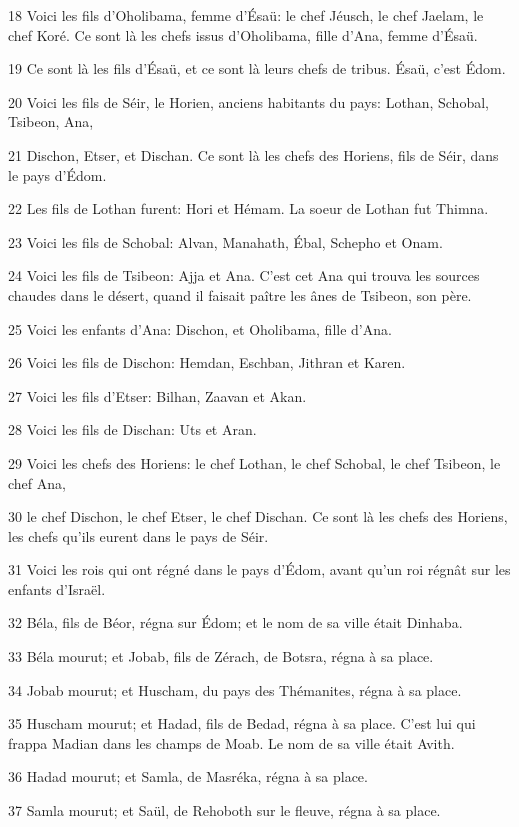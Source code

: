 \par 18 Voici les fils d'Oholibama, femme d'Ésaü: le chef Jéusch, le chef Jaelam, le chef Koré. Ce sont là les chefs issus d'Oholibama, fille d'Ana, femme d'Ésaü.
\par 19 Ce sont là les fils d'Ésaü, et ce sont là leurs chefs de tribus. Ésaü, c'est Édom.
\par 20 Voici les fils de Séir, le Horien, anciens habitants du pays: Lothan, Schobal, Tsibeon, Ana,
\par 21 Dischon, Etser, et Dischan. Ce sont là les chefs des Horiens, fils de Séir, dans le pays d'Édom.
\par 22 Les fils de Lothan furent: Hori et Hémam. La soeur de Lothan fut Thimna.
\par 23 Voici les fils de Schobal: Alvan, Manahath, Ébal, Schepho et Onam.
\par 24 Voici les fils de Tsibeon: Ajja et Ana. C'est cet Ana qui trouva les sources chaudes dans le désert, quand il faisait paître les ânes de Tsibeon, son père.
\par 25 Voici les enfants d'Ana: Dischon, et Oholibama, fille d'Ana.
\par 26 Voici les fils de Dischon: Hemdan, Eschban, Jithran et Karen.
\par 27 Voici les fils d'Etser: Bilhan, Zaavan et Akan.
\par 28 Voici les fils de Dischan: Uts et Aran.
\par 29 Voici les chefs des Horiens: le chef Lothan, le chef Schobal, le chef Tsibeon, le chef Ana,
\par 30 le chef Dischon, le chef Etser, le chef Dischan. Ce sont là les chefs des Horiens, les chefs qu'ils eurent dans le pays de Séir.
\par 31 Voici les rois qui ont régné dans le pays d'Édom, avant qu'un roi régnât sur les enfants d'Israël.
\par 32 Béla, fils de Béor, régna sur Édom; et le nom de sa ville était Dinhaba.
\par 33 Béla mourut; et Jobab, fils de Zérach, de Botsra, régna à sa place.
\par 34 Jobab mourut; et Huscham, du pays des Thémanites, régna à sa place.
\par 35 Huscham mourut; et Hadad, fils de Bedad, régna à sa place. C'est lui qui frappa Madian dans les champs de Moab. Le nom de sa ville était Avith.
\par 36 Hadad mourut; et Samla, de Masréka, régna à sa place.
\par 37 Samla mourut; et Saül, de Rehoboth sur le fleuve, régna à sa place.
